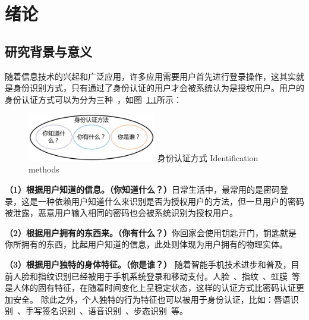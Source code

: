 

\chapter{绪论}
\label{chap:intro}
\section{研究背景与意义}
随着信息技术的兴起和广泛应用，许多应用需要用户首先进行登录操作，这其实就是身份识别方式，只有通过了身份认证的用户才会被系统认为是授权用户。用户的身份认证方式可以为分为三种~\cite{Huang2011A}，如图~\ref{fig:identification-method}所示：
\begin{figure}[!htp]
  \centering
  \includegraphics[width=0.5\textwidth]{figure/identification-method.pdf}
  \bicaption
    {身份认证方式}
    {Identification methods}
  \label{fig:identification-method}
\end{figure}

\textbf{（1）根据用户知道的信息。（你知道什么？）}日常生活中，最常用的是密码登录，这是一种依赖用户知道什么来识别是否为授权用户的方法，但一旦用户的密码被泄露，恶意用户输入相同的密码也会被系统识别为授权用户。

\textbf{（2）根据用户拥有的东西来。（你有什么？）}你回家会使用钥匙开门，钥匙就是你所拥有的东西，比起用户知道的信息，此处则体现为用户拥有的物理实体。

\textbf{（3）根据用户独特的身体特征。（你是谁？）} 随着智能手机技术进步和普及，目前人脸和指纹识别已经被用于手机系统登录和移动支付。人脸~\cite{12717}、指纹~\cite{Andrew2005Handbook}、虹膜~\cite{Wildes1997Iris}等是人体的固有特征，在随着时间变化上呈稳定状态，这样的认证方式比密码认证更加安全。 除此之外，个人独特的行为特征也可以被用于身份认证，比如：唇语识别~\cite{Cetingul2006Discriminative}、手写签名识别~\cite{Plamondona1989Automatic}、语音识别~\cite{Rashid2008Security}、步态识别~\cite{Boulgouris2005Gait}等。 


